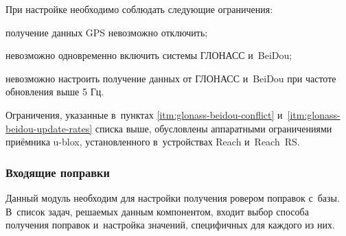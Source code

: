 При настройке необходимо соблюдать следующие ограничения:
\begin{alphitemize}
  \item получение данных GPS невозможно отключить;
  \item \label{itm:glonass-beidou-conflict} невозможно одновременно включить системы ГЛОНАСС и~BeiDou;
  \item \label{itm:glonass-beidou-update-rates} невозможно настроить получение данных от ГЛОНАСС и~BeiDou при частоте обновления выше 5 Гц.
\end{alphitemize}

Ограничения, указанные в~пунктах \ref{itm:glonass-beidou-conflict} и~\ref{itm:glonass-beidou-update-rates} списка выше, обусловлены аппаратными ограничениями приёмника u-blox, установленного в~устройствах Reach и~Reach~RS.


\subsubsection{Входящие поправки}

Данный модуль необходим для настройки получения ровером поправок с~базы. В~список задач, решаемых данным компонентом, входит выбор способа получения поправок и~настройка значений, специфичных для каждого из них.

